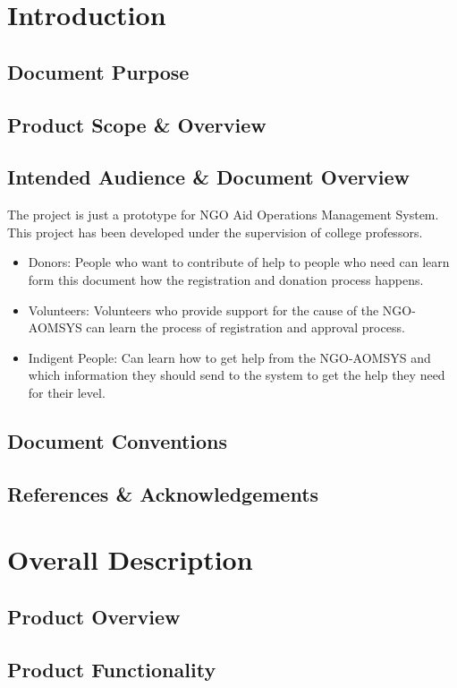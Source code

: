 \documentclass{report}
\begin{document}
	\chapter{Introduction}
	\section{Document Purpose}
	\section{Product Scope \& Overview}
	\section{Intended Audience \& Document Overview}
	 The project is just a prototype for NGO Aid Operations Management System. This project has been developed under the supervision of college professors.  
	\begin{itemize}
	
	\item Donors: People who want to contribute of help to people who need can learn form this document how the registration and donation process happens.
	\item  Volunteers: Volunteers who provide support for the cause of the NGO-AOMSYS can learn the process of registration and approval process.
	\item Indigent People: Can learn how to get help from the NGO-AOMSYS and which information they should send to the system to get the help they need for their level.
	
	

	\end{itemize}
	\section{Document Conventions}
	\section{References \& Acknowledgements}
	\chapter{Overall Description}
	\section{Product Overview}
	\section{Product Functionality}
\end{document}
